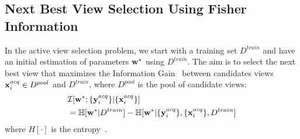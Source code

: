 \subsection{Next Best View Selection Using Fisher Information}\label{sec:nbvs}
In the active view selection problem, we start with a training set $D^{train}$ and have an initial estimation of parameters ${\bf w}^*$ using $D^{train}$. The aim is to select the next best view that maximizes the Information Gain~\cite{lindleyEIG, HoulsbyBAL,KirschBatchBALD} between candidates views ${\bf x}^{acq}_i \in D^{pool}$ and $D^{train}$, where $D^{pool}$ is the pool of candidate views:
\begin{align}
    & \mathcal{I}[{\bf w}^*; \{{\bf y}^{acq}_i\}|\{{\bf x}^{acq}_i\}] \nonumber \\
    & = \mathbb{H}[{\bf w}^* | D^{train}] - \mathbb{H} [{\bf w}^*| \{{\bf y}^{acq}_i\}, \{{\bf x}^{acq}_i\}, D^{train}] 
    \label{eq:entropy-acq}
\end{align}
where $H[\cdot]$ is the entropy~\cite{kirsch2022unifying}.

